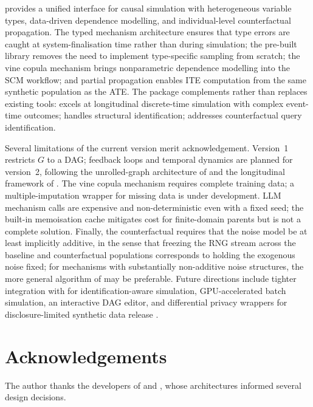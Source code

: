 \documentclass[article]{jss}
\begin{document}
 provides a unified interface for causal simulation with
heterogeneous variable types, data-driven dependence modelling, and
individual-level counterfactual propagation. The typed mechanism architecture
ensures that type errors are caught at system-finalisation time rather than during
simulation; the pre-built library removes the need to implement type-specific
sampling from scratch; the vine copula mechanism brings nonparametric dependence
modelling into the SCM workflow; and partial propagation enables ITE computation
from the same synthetic population as the ATE. The package complements rather than
replaces existing tools:  \citep{denz2026simdag} excels at
longitudinal discrete-time simulation with complex event-time outcomes;
 \citep{textor2016dagitty} handles structural identification;
 \citep{tikka2022cfid} addresses counterfactual query identification.

Several limitations of the current version merit acknowledgement. Version~1
restricts $G$ to a DAG; feedback loops and temporal dynamics are planned for
version~2, following the unrolled-graph architecture of
\citet{bongers2021foundations} and the longitudinal framework of
. The vine copula mechanism requires complete training data; a
multiple-imputation wrapper for missing data is under development. LLM mechanism
calls are expensive and non-deterministic even with a fixed seed; the built-in
memoisation cache mitigates cost for finite-domain parents but is not a complete
solution. Finally, the  counterfactual requires that the
noise model be at least implicitly additive, in the sense that freezing the RNG
stream across the baseline and counterfactual populations corresponds to holding
the exogenous noise fixed; for mechanisms with substantially non-additive noise
structures, the more general algorithm of \citet{karvanen2024simcf} may be
preferable. Future directions include tighter integration with  for
identification-aware simulation, GPU-accelerated batch simulation, an interactive
DAG editor, and differential privacy wrappers for disclosure-limited synthetic
data release \citep{nowok2016synthpop, reiter2002satisfying}.


\section*{Acknowledgements}
The author thanks the developers of  \citep{nagler2022rvinecopulib}
and  \citep{sofrygin2017simcausal}, whose architectures informed
several design decisions.
\end{document}
